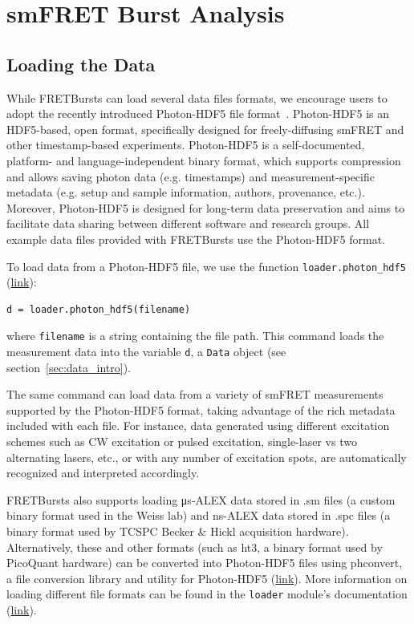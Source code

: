 \documentclass[10pt,letterpaper]{article}
\begin{document}
\section{smFRET Burst Analysis}
\label{sec:analysis}

\subsection{Loading the Data}
\label{sec:dataload}
While FRETBursts can load several data files formats,
we encourage users to adopt the recently introduced Photon-HDF5
file format~\cite{Ingargiola2016}.
Photon-HDF5 is an HDF5-based, open format, specifically designed
for freely-diffusing smFRET and
other timestamp-based experiments.
Photon-HDF5 is a self-documented, platform- and language-independent binary format,
which supports compression and allows saving photon data (e.g. timestamps)
and measurement-specific metadata
(e.g. setup and sample information, authors, provenance, etc.).
Moreover, Photon-HDF5 is designed for long-term data preservation and aims
to facilitate data sharing
between different software and research groups.
All example data files provided with FRETBursts use the Photon-HDF5 format.

To load data from a Photon-HDF5 file, we use the function \verb|loader.photon_hdf5|
(\href{http://fretbursts.readthedocs.org/en/latest/loader.html#fretbursts.loader.photon_hdf5}{link}):

\begin{lstlisting}
d = loader.photon_hdf5(filename)
\end{lstlisting}

\noindent
where \verb|filename| is a string containing the file path.
This command loads the measurement data into the variable \verb|d|,
a \verb|Data| object (see section~\ref{sec:data_intro}).

The same command can load data from a variety of smFRET measurements supported
by the Photon-HDF5 format, taking advantage of the rich metadata included with each file.
For instance, data generated using different excitation schemes such as CW excitation
or pulsed excitation, single-laser vs two alternating lasers, etc.,
or with any number of excitation spots, are automatically recognized and interpreted accordingly.

FRETBursts also supports loading μs-ALEX data stored in .sm files
(a custom binary format used in the Weiss lab) and
ns-ALEX data stored in .spc files (a binary format used by TCSPC Becker \& Hickl acquisition hardware).
Alternatively, these and other formats (such as ht3, a binary format used by PicoQuant hardware)
can be converted into Photon-HDF5 files using phconvert,
a file conversion library and utility for Photon-HDF5
(\href{http://photon-hdf5.github.io/phconvert/}{link}).
More information on loading different file formats
can be found in the \verb|loader| module's documentation
(\href{http://fretbursts.readthedocs.org/en/latest/loader.html}{link}).
\end{document}
